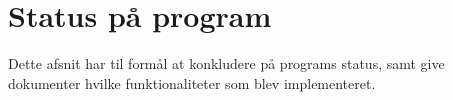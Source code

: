 \section{Status på program} 
\label{sec:status_p_program}

Dette afsnit har til formål at konkludere på programs status, samt give dokumenter hvilke funktionaliteter som blev implementeret. 
